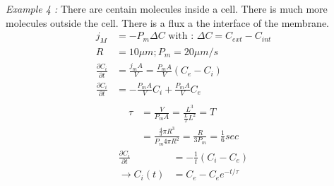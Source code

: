 \documentclass[10pt,a4paper]{article}
\begin{document}
\emph{Example 4 :} There are centain molecules inside a cell. There is much more molecules outside the cell. There is a flux a the interface of the membrane.
\begin{align*}
    j_M &= -P_m \Delta C \text{ with : } \Delta C = C_{ext} - C_{int}\\
    R &= 10 \mu m ; P_m = 20 \mu m/s\\
    \frac{\partial C_i}{\partial t} &= \frac{j_m A}{V} = \frac{P_mA}{V} (C_e -C_i)\\
    \frac{\partial C_i}{\partial t} &= -\frac{P_m A}{V}C_i + \frac{P_m A}{V}C_e \\
\end{align*}
\begin{align*}
    \tau &= \frac{V}{P_m A} = \frac{L^3}{\frac{L}{T}{L^2}} = T\\
    &= \frac{\frac{4}{3}\pi R^3}{P_m 4 \pi R^2} = \frac{R}{3P_m} = \frac{1}{6}sec
\end{align*}
\begin{align*}
    \frac{\partial C_i}{\partial t} &= -\frac{1}{t}(C_i - C_e) \\
    \rightarrow C_i(t) &= C_e - C_e e^{-t/\tau}
\end{align*}
\end{document}
